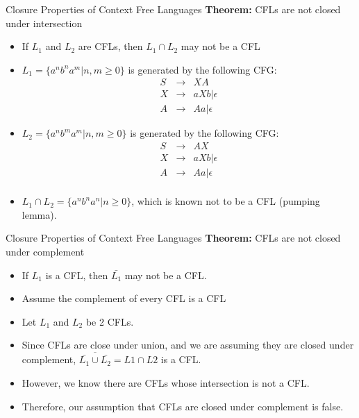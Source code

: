 \documentclass{beamer}
\begin{document}
\begin{frame}{Closure Properties of Context Free Languages}
	\textbf{Theorem:} CFLs are not closed under intersection
	\begin{itemize}
		\item If $L_1$ and $L_2$ are CFLs, then $L_1 \cap L_2$ may not be a CFL
	\end{itemize}
\proofname
\begin{itemize}
	\item $L_1 = \{a^nb^na^m | n, m \geq 0\}$ is generated by the following CFG:
	\begin{eqnarray*}
		S &\rightarrow& XA \\
		X &\rightarrow& aXb|\epsilon \\
		A &\rightarrow& Aa|\epsilon 
	\end{eqnarray*}
\item $L_2 = \{a^nb^ma^m | n, m \geq 0\}$ is generated by the following CFG:
\begin{eqnarray*}
S & \rightarrow & AX \\
X & \rightarrow & aXb | \epsilon \\
A & \rightarrow & Aa | \epsilon \\
\end{eqnarray*}
\item $L_1 \cap L_2 = \{a^nb^na^n| n \geq 0\}$, which is known not to be a CFL
(pumping lemma).

\end{itemize}
\end{frame}
\begin{frame}{Closure Properties of Context Free Languages}
	\textbf{Theorem:} CFLs are not closed under complement
	\begin{itemize}
		\item If $L_1$ is a CFL, then $\bar{L_1}$ may not be a CFL.
	\end{itemize}
	\proofname
	\begin{itemize}
		\item Assume the complement of every CFL is a CFL
		\item Let $L_1$ and $L_2$ be 2 CFLs.
		\item Since CFLs are close under union, and we are assuming they are closed
		under complement, $\overline{\bar{L_1} \cup \bar{L_2}} = L1 \cap L2$
		is a CFL.
	\item However, we know there are CFLs whose intersection is not a CFL.
	\item Therefore, our assumption that CFLs are closed under complement is
	false.
	\end{itemize}
\end{frame}
\end{document}
